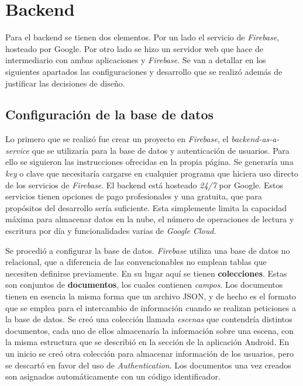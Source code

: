\section{Backend}

Para el backend se tienen dos elementos. Por un lado el servicio de \textit{Firebase}, hosteado por Google. Por otro lado se hizo un servidor web que hace de intermediario con ambas aplicaciones y \textit{Firebase}. Se van a detallar en los siguientes apartados las configuraciones y desarrollo que se realizó además de justificar las decisiones de diseño.

\subsection{Configuración de la base de datos}

Lo primero que se realizó fue crear un proyecto en \textit{Firebase}, el \textit{backend-as-a-service} que se utilizaría para la base de datos y autenticación de usuarios. Para ello se siguieron las instrucciones ofrecidas en la propia página. Se generaría una \textit{key} o clave que necesitaría cargarse en cualquier programa que hiciera uso directo de los servicios de \textit{Firebase}. El backend está hosteado \textit{24/7} por Google. Estos servicios tienen opciones de pago profesionales y una gratuita, que para propósitos del desarrollo sería suficiente. Esta simplemente limita la capacidad máxima para almacenar datos en la nube, el número de operaciones de lectura y escritura por día y funcionalidades varias de \textit{Google Cloud}.

Se procedió a configurar la base de datos. \textit{Firebase} utiliza una base de datos no relacional, que a diferencia de las convencionables no emplean tablas que necesiten definirse previamente. En su lugar aquí se tienen \textbf{colecciones}. Estas son conjuntos de \textbf{documentos}, los cuales contienen \textit{campos}. Los documentos tienen en esencia la misma forma que un archivo JSON, y de hecho es el formato que se emplea para el intercambio de información cuando se realizan peticiones a la base de datos. Se creó una colección llamada \textit{escenas} que contendría distintos documentos, cada uno de ellos almacenaría la información sobre una escena, con la misma estructura que se describió en la sección de la aplicación Android. En un inicio se creó otra colección para almacenar información de los usuarios, pero se descartó en favor del uso de \textit{Authentication}. Los documentos una vez creados son asignados automáticamente con un código identificador.

